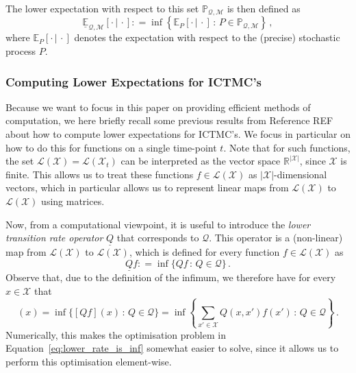 \documentclass[twoside,11pt]{article}
\newcommand{\reals}{\mathbb{R}}
\newcommand{\states}{\mathcal{X}}
\newcommand{\gambles}{\mathcal{L}}
\newcommand{\gamblesX}{\gambles(\states)}
\newcommand{\rateset}{\mathcal{Q}}
\newcommand{\lrate}{\underline{Q}}
\newcommand{\coloneqq}{:\!=}
\begin{document}
The lower expectation with respect to this set $\mathbb{P}_{\rateset,\mathcal{M}}$ is then defined as
\begin{equation*}
\underline{\mathbb{E}}_{\rateset,\mathcal{M}}[\cdot\,\vert\,\cdot] \coloneqq \inf\left\{ \mathbb{E}_P[\cdot\,\vert\,\cdot]\,:\, P\in\mathbb{P}_{\rateset,\mathcal{M}} \right\}\,,
\end{equation*}
where $\mathbb{E}_P[\cdot\,\vert\,\cdot]$ denotes the expectation with respect to the (precise) stochastic process $P$.

\subsubsection{Computing Lower Expectations for ICTMC's}\label{subsec:ICTMC_computations}

Because we want to focus in this paper on providing efficient methods of computation, we here briefly recall some previous results from Reference REF about how to compute lower expectations for ICTMC's. We focus in particular on how to do this for functions on a single time-point $t$. Note that for such functions, the set $\gamblesX=\gambles(\states_t)$ can be interpreted as the vector space $\reals^{\lvert\states\rvert}$, since $\states$ is finite. This allows us to treat these functions $f\in\gamblesX$ as $\lvert\states\rvert$-dimensional vectors, which in particular allows us to represent linear maps from $\gamblesX$ to $\gamblesX$ using matrices.

Now, from a computational viewpoint, it is useful to introduce the \emph{lower transition rate operator} $\lrate$ that corresponds to $\rateset$. This operator is a (non-linear) map from $\gamblesX$ to $\gamblesX$, which is defined for every function $f\in\gamblesX$ as
\begin{equation}\label{eq:lower_rate_is_inf}
\lrate f \coloneqq \inf\{ Qf\,:\, Q\in\rateset \}\,.
\end{equation}
Observe that, due to the definition of the infimum, we therefore have for every $x\in\states$ that
\begin{equation*}
[\lrate f](x) = \inf\{[Qf](x)\,:\,Q\in\rateset\} = \inf\left\{ \sum_{x'\in\states}Q(x,x')f(x')\,:\,Q\in\rateset \right\}\,.
\end{equation*}
Numerically, this makes the optimisation problem in Equation~\ref{eq:lower_rate_is_inf} somewhat easier to solve, since it allows us to perform this optimisation element-wise.
\end{document}
